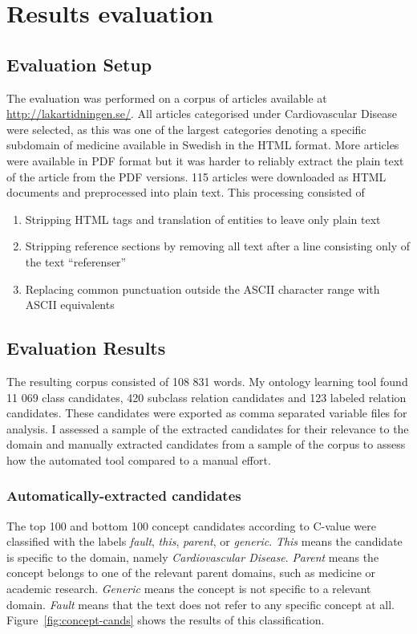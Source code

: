 \documentclass[a4paper]{report}
\begin{document}
\chapter{Results evaluation}
\label{chap:eval}

\section{Evaluation Setup}

The evaluation was performed on a corpus of articles available at \url{http://lakartidningen.se/}.
All articles categorised under Cardiovascular Disease were selected, as this was one of the largest categories denoting a specific subdomain of medicine available in Swedish in the HTML format.
More articles were available in PDF format but it was harder to reliably extract the plain text of the article from the PDF versions.
115 articles were downloaded as HTML documents and preprocessed into plain text.
This processing consisted of
\begin{enumerate}
\item Stripping HTML tags and translation of entities to leave only plain text
\item Stripping reference sections by removing all text after a line consisting only of the text ``referenser''
\item Replacing common punctuation outside the ASCII character range with ASCII equivalents
\end{enumerate}

\section{Evaluation Results}

The resulting corpus consisted of 108 831 words.
My ontology learning tool found 11 069 class candidates, 420 subclass relation candidates and 123 labeled relation candidates.
These candidates were exported as comma separated variable files for analysis.
I assessed a sample of the extracted candidates for their relevance to the domain and manually extracted candidates from a sample of the corpus to assess how the automated tool compared to a manual effort.

\subsection{Automatically-extracted candidates}
\label{sec:results:eval:cands}

The top 100 and bottom 100 concept candidates according to C-value were classified with the labels \emph{fault}, \emph{this}, \emph{parent}, or \emph{generic}.
\emph{This} means the candidate is specific to the domain, namely \emph{Cardiovascular Disease}.
\emph{Parent} means the concept belongs to one of the relevant parent domains, such as medicine or academic research.
\emph{Generic} means the concept is not specific to a relevant domain.
\emph{Fault} means that the text does not refer to any specific concept at all.
Figure~\ref{fig:concept-cands} shows the results of this classification.
\end{document}
